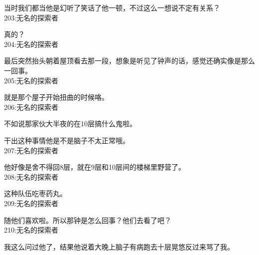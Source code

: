 当时我们都当他是幻听了笑话了他一顿，不过这么一想说不定有关系？\\

203:无名的探索者

真的？\\

204:无名的探索者

最后突然抬头朝着屋顶看去那一段，想象是听见了钟声的话，感觉还确实像是那么一回事。\\

205:无名的探索者

就是那个屋子开始扭曲的时候咯。\\

206:无名的探索者

不如说那家伙大半夜的在10层搞什么鬼啦。

干出这种事情他是不是脑子不太正常哦。\\

207:无名的探索者

他好像是舍不得回8层，就在9层和10层间的楼梯里野营了。\\

208:无名的探索者

这种队伍吃枣药丸。\\

209:无名的探索者

随他们喜欢啦。所以那钟是怎么回事？他们去看了吧？\\

210:无名的探索者

我这么问过他了，结果他说着大晚上脑子有病跑去十层晃悠反过来骂了我。\\

